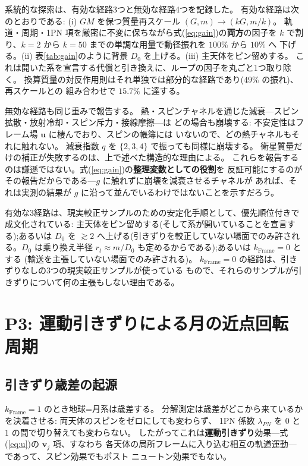 \documentclass[a4paper,10pt,twocolumn]{ltjsarticle}
\begin{document}
系統的な探索は、有効な経路3つと無効な経路4つを記録した。
有効な経路は次のとおりである: (i) $GM$ を保つ質量再スケール $(G,m)\to(kG,m/k)$。
軌道・周期・1PN 項を厳密に不変に保ちながら式(\ref{eq:gain})の\textbf{両方}の因子を
$k$ で割り、$k=2$ から $k=50$ までの単調な用量で動径振れを $100\%$ から $10\%$ へ
下げる。(ii) 表\ref{tab:gain}のように背景 $D_0$ を上げる。(iii) 主天体をピン留めする。
これは開いた系を宣言する代償と引き換えに、ループの因子を丸ごと1つ取り除く。
換算質量の対反作用則はそれ単独では部分的な経路であり($49\%$ の振れ)、再スケールとの
組み合わせで $15.7\%$ に達する。

無効な経路も同じ重みで報告する。
熱・スピンチャネルを通じた減衰---スピン拡散・放射冷却・スピン斥力・接線摩擦---は
どの場合も崩壊する: 不安定性はフレーム場 $\bm u$ に棲んでおり、スピンの帳簿には
いないので、どの熱チャネルもそれに触れない。
減衰指数 $q$ を $\{2,3,4\}$ で振っても同様に崩壊する。
衛星質量だけの補正が失敗するのは、上で述べた構造的な理由による。
これらを報告するのは謙遜ではない。式(\ref{eq:gain})の\textbf{整理変数としての役割}を
反証可能にするのがその報告だからである---$g$ に触れずに崩壊を減衰させるチャネルが
あれば、それは実測の結果が $g$ に沿って並んでいるわけではないことを示すだろう。

有効な3経路は、現実較正サンプルのための安定化手順として、優先順位付きで成文化されている:
主天体をピン留めする(そして系が開いていることを宣言する);あるいは $D_0$ を
$\gtrsim2$ へ上げる(引きずりを較正していない場面でのみ許される。$D_0$ は乗り換え半径
$r_t\approx m/D_0$ も定めるからである);あるいは $k_{\mathrm{Frame}}=0$ とする
(輸送を主張していない場面でのみ許される)。
$k_{\mathrm{Frame}}=0$ の経路は、引きずりなしの3つの現実較正サンプルが使っている
もので、それらのサンプルが引きずりについて何の主張もしない理由である。

\section{P3: 運動引きずりによる月の近点回転周期}
\label{sec:p3}

\subsection{引きずり歳差の起源}
\label{sec:p3origin}

$k_{\mathrm{Frame}}=1$ のとき地球=月系は歳差する。
分解測定は歳差がどこから来ているかを決着させる: 両天体のスピンをゼロにしても変わらず、
1PN 係数 $\lambda_{PN}$ を $0$ と $1$ の間で切り替えても変わらない。
したがってこれは\textbf{運動引きずり}効果---式(\ref{eq:u})の $\bm v_j$ 項、すなわち
各天体の局所フレームに入り込む相互の軌道運動---であって、スピン効果でもポスト
ニュートン効果でもない。
\end{document}
